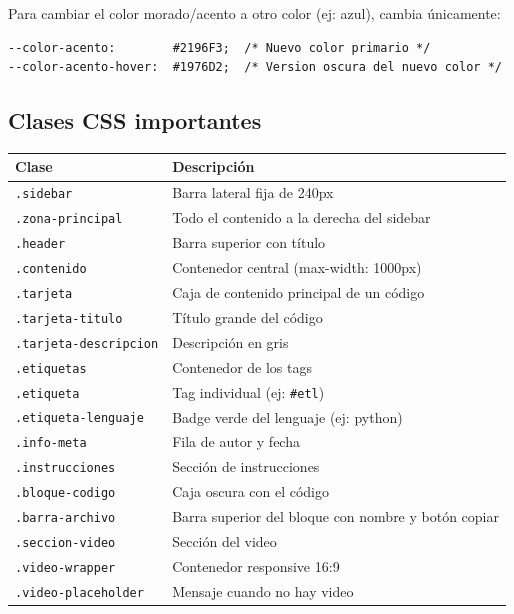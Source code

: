 \documentclass[12pt, a4paper]{article}
\newcommand{\clase}[1]{\texttt{\textcolor{cpAzul}{.#1}}}
\begin{document}
Para cambiar el color morado/acento a otro color (ej: azul), cambia únicamente:

\begin{lstlisting}[style=cssInline]
--color-acento:        #2196F3;  /* Nuevo color primario */
--color-acento-hover:  #1976D2;  /* Version oscura del nuevo color */
\end{lstlisting}

\subsection{Clases CSS importantes}

\begin{longtable}{lp{9cm}}
\toprule
\textbf{Clase} & \textbf{Descripción} \\
\midrule
\endhead
\clase{sidebar}              & Barra lateral fija de 240px \\
\clase{zona-principal}       & Todo el contenido a la derecha del sidebar \\
\clase{header}               & Barra superior con título \\
\clase{contenido}            & Contenedor central (max-width: 1000px) \\
\clase{tarjeta}              & Caja de contenido principal de un código \\
\clase{tarjeta-titulo}       & Título grande del código \\
\clase{tarjeta-descripcion}  & Descripción en gris \\
\clase{etiquetas}            & Contenedor de los tags \\
\clase{etiqueta}             & Tag individual (ej: \texttt{\#etl}) \\
\clase{etiqueta-lenguaje}    & Badge verde del lenguaje (ej: python) \\
\clase{info-meta}            & Fila de autor y fecha \\
\clase{instrucciones}        & Sección de instrucciones \\
\clase{bloque-codigo}        & Caja oscura con el código \\
\clase{barra-archivo}        & Barra superior del bloque con nombre y botón copiar \\
\clase{seccion-video}        & Sección del video \\
\clase{video-wrapper}        & Contenedor responsive 16:9 \\
\clase{video-placeholder}    & Mensaje cuando no hay video \\

\end{longtable}
\end{document}
